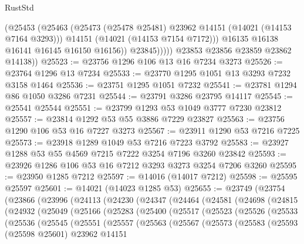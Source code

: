 \begin{lexlean}{RustStd}
\begin{coremodule}
                    (@25453
                      (@25463
                        (@25473 (@25478 @25481) @23962 @14151 (@14021 (@14153 @7164 @3293)))
                        @14151
                        (@14021 (@14153 @7154 @7172)))
                      @16135
                      @16138
                      @16141
                      @16145
                      @16150
                      @16156))
                  @23845)))))
        @23853
        @23856
        @23859
        @23862
        @14138))
@25523 := @23756 @1296 @106 @13 @16 @7234 @3273
@25526 := @23764 @1296 @13 @7234
@25533 := @23770 @1295 @1051 @13 @3293 @7232 @3158 @1464
@25536 := @23751 @1295 @1051 @7232
@25541 := @23781 @1294 @86 @1050 @3286 @7231
@25544 := @23791 @3286 @23795 @14117
@25545 := @25541 @25544
@25551 := @23799 @1293 @53 @1049 @3777 @7230 @23812
@25557 := @23814 @1292 @53 @55 @3886 @7229 @23827
@25563 := @23756 @1290 @106 @53 @16 @7227 @3273
@25567 := @23911 @1290 @53 @7216 @7225
@25573 := @23918 @1289 @1049 @53 @7216 @7223 @3792
@25583 := @23927 @1288 @53 @55 @4569 @7215 @7222 @3254 @7196 @3260 @23842
@25593 := @23926 @1286 @106 @53 @16 @7212 @3293 @3273 @3254 @7206 @3260
@25595 := @23950 @1285 @7212
@25597 := @14016 (@14017 @7212)
@25598 := @25595 @25597
@25601 := @14021 (@14023 @1285 @53)
@25655 := @23749
    (@23754
      (@23866
        (@23996
          (@24113
            (@24230
              (@24347
                (@24464
                  (@24581
                    (@24698
                      (@24815
                        (@24932
                          (@25049
                            (@25166
                              (@25283
                                (@25400
                                  (@25517
                                    (@25523
                                      (@25526
                                        (@25533
                                          (@25536
                                            (@25545
                                              (@25551
                                                (@25557
                                                  (@25563
                                                    (@25567
                                                      (@25573
                                                        (@25583
                                                          (@25593
                                                            (@25598 @25601)
                                                            @23962
                                                            @14151

\end{coremodule}
\end{lexlean}
